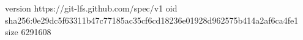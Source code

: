 version https://git-lfs.github.com/spec/v1
oid sha256:0e29dc5f63311b47c77185ac35cf6cd18236e01928d962575b414a2af6ca4fe1
size 6291608
